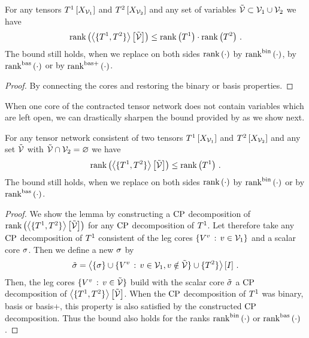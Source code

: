 \begin{lemma}
    \label{lem:sparsityGeneralContraction}
    For any tensors $T^{1}\left[X_{\mathcal{V}_1}\right]$ and $T^{2}\left[X_{\mathcal{V}_2}\right]$ and any set of variables $\tilde{\mathcal{V}}\subset\mathcal{V}_1\cup\mathcal{V}_2$ we have
    \[ \mathrm{rank}\left(\left\langle \{T^{1},T^{2}\}\right\rangle \left[ \tilde{\mathcal{V}} \right]\right) \leq \mathrm{rank}\left(T^{1}\right) \cdot \mathrm{rank}\left(T^{2}\right) \, . \]
    The bound still holds, when we replace on both sides $\mathrm{rank}\left(\cdot\right)$ by $\mathrm{rank}^{\mathrm{bin}}\left(\cdot\right)$, by $\mathrm{rank}^{\mathrm{bas}}\left(\cdot\right)$ or by $\mathrm{rank}^{\mathrm{bas+}}\left(\cdot\right)$.
\end{lemma}
\begin{proof}
    By connecting the cores and restoring the binary or basis properties.
\end{proof}

When one core of the contracted tensor network does not contain variables which are left open, we can drastically sharpen the bound provided by  as we show next.

\begin{lemma}
    \label{lem:sparsityDisjointContraction}
    For any tensor network consistent of two tensors $T^{1}\left[X_{\mathcal{V}_1}\right]$ and $T^{2}\left[X_{\mathcal{V}_2}\right]$ and any set $\tilde{\mathcal{V}}$ with $\tilde{\mathcal{V}}\cap\mathcal{V}_2=\varnothing$ we have
    \[ \mathrm{rank}\left(\left\langle \{T^{1},T^{2}\}\right\rangle \left[ \tilde{\mathcal{V}} \right]\right) \leq \mathrm{rank}\left(T^{1}\right) \, . \]
    The bound still holds, when we replace on both sides $\mathrm{rank}\left(\cdot\right)$ by $\mathrm{rank}^{\mathrm{bin}}\left(\cdot\right)$ or by $\mathrm{rank}^{\mathrm{bas}}\left(\cdot\right)$.
\end{lemma}
\begin{proof}
    We show the lemma by constructing a $\mathrm{CP}$ decomposition of $\mathrm{rank}\left(\left\langle \{T^{1},T^{2}\}\right\rangle \left[ \tilde{\mathcal{V}} \right]\right) $ for any $\mathrm{CP}$ decomposition of $T^{1}$.
    Let therefore take any $\mathrm{CP}$ decomposition of $T^{1}$ consistent of the leg cores $\{V^{v} \, : \, v \in \mathcal{V}_1 \}$ and a scalar core $\sigma$.
    Then we define a new $\sigma$ by
    \[ \tilde{\sigma} = \left\langle \{\sigma\}\cup \{V^{v} \, : \, v \in \mathcal{V}_1 , v \notin \tilde{\mathcal{V}} \} \cup \{T^{2}\} \right\rangle \left[ I \right] \, . \]
    Then, the leg cores $\{V^{v} \, : \, v \in \tilde{\mathcal{V}} \}$ build with the scalar core $\tilde{\sigma}$ a $\mathrm{CP}$ decomposition of $\left\langle \{T^{1},T^{2}\}\right\rangle \left[ \tilde{\mathcal{V}} \right]$.
    When the $\mathrm{CP}$ decomposition of $T^{1}$ was binary, basis or basis+, this property is also satisfied by the constructed $\mathrm{CP}$ decomposition.
    Thus the bound also holds for the ranks $\mathrm{rank}^{\mathrm{bin}}\left(\cdot\right)$ or $\mathrm{rank}^{\mathrm{bas}}\left(\cdot\right)$.
\end{proof}


